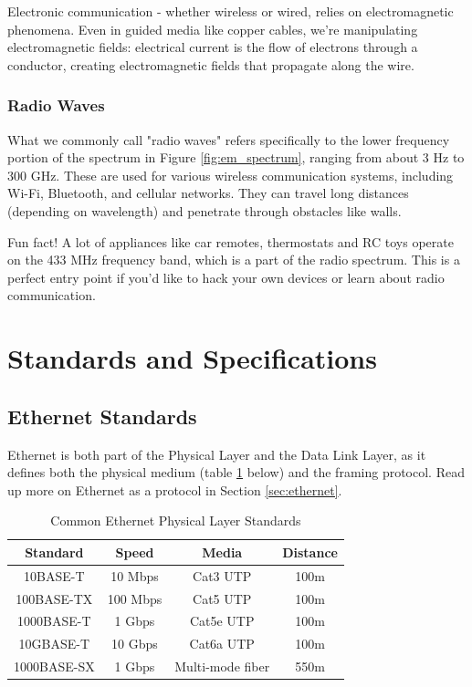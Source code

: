 \begin{importantblock}
    Electronic communication - whether wireless or wired, relies on electromagnetic phenomena. Even in guided media like copper cables, we're manipulating electromagnetic fields: electrical current is the flow of electrons through a conductor, creating electromagnetic fields that propagate along the wire.
\end{importantblock} 

\subsubsection*{Radio Waves}
What we commonly call "radio waves" refers specifically to the lower frequency portion of the spectrum in Figure \ref{fig:em_spectrum}, ranging from about 3 Hz to 300 GHz. These are used for various wireless communication systems, including Wi-Fi, Bluetooth, and cellular networks. They can travel long distances (depending on wavelength) and penetrate through obstacles like walls.

\begin{noteblock}
    Fun fact! A lot of appliances like car remotes, thermostats and RC toys operate on the 433 MHz frequency band, which is a part of the radio spectrum. This is a perfect entry point if you'd like to hack your own devices or learn about radio communication.
\end{noteblock}

\section{Standards and Specifications}
\subsection*{Ethernet Standards}
Ethernet is both part of the Physical Layer and the Data Link Layer, as it defines both the physical medium (table \ref{tab:ethernet_standards} below) and the framing protocol. Read up more on Ethernet as a protocol in Section \ref{sec:ethernet}.

\begin{table}[h]
    \centering
    \begin{tabular}{|c|c|c|c|}
        \hline
        \textbf{Standard} & \textbf{Speed} & \textbf{Media} & \textbf{Distance} \\
        \hline
        10BASE-T & 10 Mbps & Cat3 UTP & 100m \\
        100BASE-TX & 100 Mbps & Cat5 UTP & 100m \\
        1000BASE-T & 1 Gbps & Cat5e UTP & 100m \\
        10GBASE-T & 10 Gbps & Cat6a UTP & 100m \\
        1000BASE-SX & 1 Gbps & Multi-mode fiber & 550m \\
        \hline
    \end{tabular}
    \caption{Common Ethernet Physical Layer Standards}\label{tab:ethernet_standards}
\end{table}

